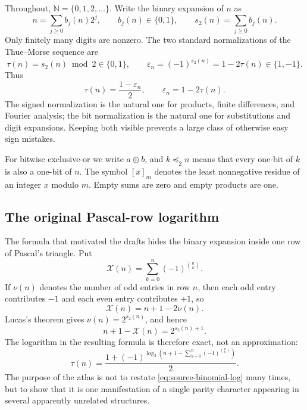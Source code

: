 \documentclass[11pt,oneside]{article}
\theoremstyle{definition}
\theoremstyle{remark}
\newcommand{\N}{\mathbb N}
\newcommand{\wt}{s_2}
\newcommand{\eps}{\varepsilon}
\newcommand{\xor}{\mathbin{\oplus}}
\newcommand{\submask}{\mathrel{\preccurlyeq_2}}
\newcommand{\res}[2]{\left[#1\right]_{#2}}
\begin{document}
Throughout, \(\N=\{0,1,2,\ldots\}\).  Write the binary expansion of \(n\) as
\begin{equation}
  n=\sum_{j\ge0}b_j(n)2^j,
  \qquad b_j(n)\in\{0,1\},
  \qquad \wt(n)=\sum_{j\ge0}b_j(n).                         \label{eq:binary-expansion}
\end{equation}
Only finitely many digits are nonzero.  The two standard normalizations of the
Thue--Morse sequence are
\begin{equation}
  \tau(n)=\wt(n)\bmod2\in\{0,1\},
  \qquad
  \eps_n=(-1)^{\wt(n)}=1-2\tau(n)\in\{1,-1\}.              \label{eq:normalizations}
\end{equation}
Thus
\begin{equation}
  \tau(n)=\frac{1-\eps_n}{2},
  \qquad
  \eps_n=1-2\tau(n).                                       \label{eq:normalization-bridge}
\end{equation}
The signed normalization is the natural one for products, finite differences, and Fourier
analysis; the bit normalization is the natural one for substitutions and digit expansions.
Keeping both visible prevents a large class of otherwise easy sign mistakes.

For bitwise exclusive-or we write \(a\xor b\), and \(k\submask n\) means that every
one-bit of \(k\) is also a one-bit of \(n\).  The symbol \(\res{x}{m}\) denotes the least
nonnegative residue of an integer \(x\) modulo \(m\).  Empty sums are zero and empty
products are one.

\subsection{The original Pascal-row logarithm}

The formula that motivated the drafts hides the binary expansion inside one row of Pascal's
triangle.  Put
\begin{equation}
  \mathcal X(n)=\sum_{k=0}^{n}(-1)^{\binom nk}.              \label{eq:source-X}
\end{equation}
If \(\nu(n)\) denotes the number of odd entries in row \(n\), then each odd entry
contributes \(-1\) and each even entry contributes \(+1\), so
\begin{equation}
  \mathcal X(n)=n+1-2\nu(n).                                \label{eq:X-via-odd-count}
\end{equation}
Lucas's theorem gives \(\nu(n)=2^{\wt(n)}\), and hence
\begin{equation}
  n+1-\mathcal X(n)=2^{\wt(n)+1}.                            \label{eq:source-exact-power}
\end{equation}
The logarithm in the resulting formula is therefore exact, not an approximation:
\begin{equation}
  \boxed{
  \tau(n)=\frac{1+(-1)^{\log_2\!\left(n+1-
       \sum_{k=0}^{n}(-1)^{\binom nk}\right)}}{2}.}          \label{eq:source-binomial-log}
\end{equation}
The purpose of the atlas is not to restate \eqref{eq:source-binomial-log} many times, but to
show that it is one manifestation of a single parity character appearing in several
apparently unrelated structures.
\end{document}
